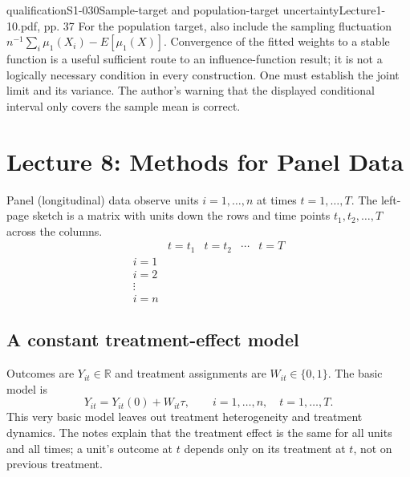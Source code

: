 \begin{reviewnote}{qualification}{S1-030}{Sample-target and population-target uncertainty}{Lecture1-10.pdf, pp. 37}
For the population target, also include the sampling fluctuation $n^{-1}\sum_i\mu_1(X_i)-E[\mu_1(X)]$. Convergence of the fitted weights to a stable function is a useful sufficient route to an influence-function result; it is not a logically necessary condition in every construction. One must establish the joint limit and its variance. The author's warning that the displayed conditional interval only covers the sample mean is correct.
\end{reviewnote}


\section{Lecture 8: Methods for Panel Data}
Panel (longitudinal) data observe units $i=1,\ldots,n$ at times $t=1,\ldots,T$. The left-page sketch is a matrix with units down the rows and time points $t_1,t_2,\ldots,T$ across the columns.
\[
\begin{array}{c|cccc}
 &t=t_1&t=t_2&\cdots&t=T\\\hline
 i=1&&&&\\i=2&&&&\\\vdots&&&&\\i=n&&&&
\end{array}
\]

\subsection{A constant treatment-effect model}
Outcomes are $Y_{it}\in\mathbb R$ and treatment assignments are $W_{it}\in\{0,1\}$. The basic model is
\[
Y_{it}=Y_{it}(0)+W_{it}\tau,\qquad i=1,\ldots,n,\quad t=1,\ldots,T.
\tag{8.1 in the notes}
\]
This very basic model leaves out treatment heterogeneity and treatment dynamics. The notes explain that the treatment effect is the same for all units and all times; a unit's outcome at $t$ depends only on its treatment at $t$, not on previous treatment. 
